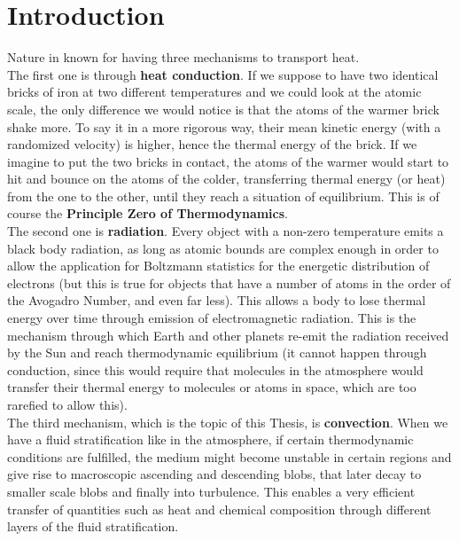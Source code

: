 

\chapter{Introduction}
Nature in known for having three mechanisms to transport heat.  \\
The first one is through \textbf{heat conduction}. If we suppose to have two identical bricks of iron at two different temperatures and we could look at the atomic scale, the only difference we would notice is that the atoms of the warmer brick shake more. To say it in a more rigorous way, their mean kinetic energy (with a randomized velocity) is higher, hence the thermal energy of the brick. If we imagine to put the two bricks in contact, the atoms of the warmer would start to hit and bounce on the atoms of the colder, transferring thermal energy (or heat) from the one to the other, until they reach a situation of equilibrium. This is of course the \textbf{Principle Zero of Thermodynamics}. \\
The second one is \textbf{radiation}. Every object with a non-zero temperature emits a black body radiation, as long as atomic bounds are complex enough in order to allow the application for Boltzmann statistics for the energetic distribution of electrons (but this is true for objects that have a number of atoms in the order of the Avogadro Number, and even far less). This allows a body to lose thermal energy over time through emission of electromagnetic radiation. This is the mechanism through which Earth and other planets re-emit the radiation received by the Sun and reach thermodynamic equilibrium (it cannot happen through conduction, since this would require that molecules in the atmosphere would transfer their thermal energy to molecules or atoms in space, which are too rarefied to allow this). \\
The third mechanism, which is the topic of this Thesis, is \textbf{convection}. When we have a fluid stratification like in the atmosphere, if certain thermodynamic conditions are fulfilled, the medium might become unstable in certain regions and give rise to macroscopic ascending and descending blobs, that later decay to smaller scale blobs and finally into turbulence. This enables a very efficient transfer of quantities such as heat and chemical composition through different layers of the fluid stratification. \\
